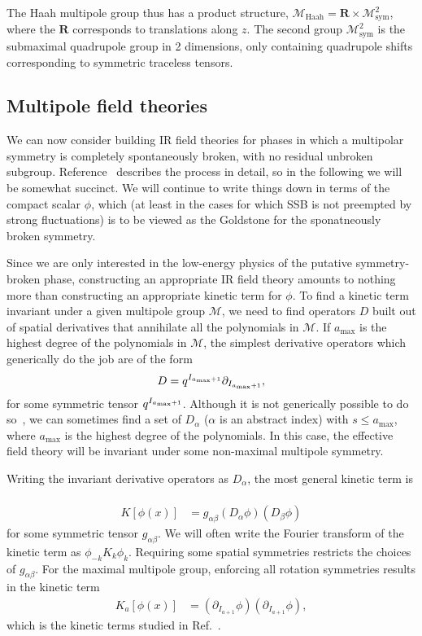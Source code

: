 \documentclass[pra,aps,twocolumn, amsfonts,amsmath,amssymb,nofootinbib,superscriptaddress]{revtex4-2}
\newcommand{\p}{\partial}
\begin{document}
The Haah multipole group thus has a product structure, $\mathcal{M}_\text{Haah} = \mathbf{R} \times \mathcal{M}^2_\text{sym}$, where the $\mathbf{R}$ corresponds to translations along $z$. The second group $\mathcal{M}^2_\text{sym}$ is the submaximal quadrupole group in 2 dimensions, only containing quadrupole shifts corresponding to symmetric traceless tensors.

\subsection{Multipole field theories} \label{sub:field}

We can now consider building IR field theories for phases in which a multipolar symmetry is completely spontaneously broken, with no residual unbroken subgroup. Reference~\cite{Gromov2019} describes the process in detail, so in the following we will be somewhat succinct. 
We will continue to write things down in terms of the compact scalar $\phi$, which (at least in the cases for which SSB is not preempted by strong fluctuations) is to be viewed as the Goldstone for the sponatneously broken symmetry. 

Since we are only interested in the low-energy physics of the putative symmetry-broken phase, constructing an appropriate IR field theory amounts to nothing more than constructing an appropriate kinetic term for $\phi$. 
To find a kinetic term invariant under a given multipole group $\mathcal{M}$, we need to find operators $D$ built out of spatial derivatives that annihilate all the polynomials in $\mathcal{M}$. If $a_\text{max}$ is the highest degree of the polynomials in $\mathcal{M}$, the simplest derivative operators which generically do the job are of the form 
\begin{align}
D = q^{I_{a_{\rm max}+1}} \p_{I_{a_{\rm max}+1}},
\end{align}
for some symmetric tensor $q^{I_{a_{\rm max}+1}}$. Although it is not generically possible to do so~\cite{Gromov2019}, we can sometimes find a set of $D_\alpha$ ($\alpha$ is an abstract index) with $s\le a_{\text{max}}$, where $a_\text{max}$ is the highest degree of the polynomials. In this case, the effective field theory will be invariant under some non-maximal multipole symmetry. 

Writing the invariant derivative operators as $D_\alpha$, the most general kinetic term is ~\cite{Gromov2019} 
\begin{align}
K[\phi(x)] &= g_{\alpha\beta} (D_\alpha \phi) (D_\beta \phi)
\end{align}
for some symmetric tensor $g_{\alpha\beta}$.
We will often write the Fourier transform of the kinetic term as $\phi_{-k} K_k \phi_k$.  Requiring some spatial symmetries restricts the choices of $g_{\alpha \beta}$. For the maximal multipole group, enforcing all rotation symmetries results in the kinetic term
\begin{align}
K_a[\phi(x)] &= (\partial_{I_{a+1}} \phi) (\partial_{I_{a+1}} \phi),
\end{align}
which is the kinetic terms studied in Ref.~\cite{Griffin2015}. 
\end{document}
